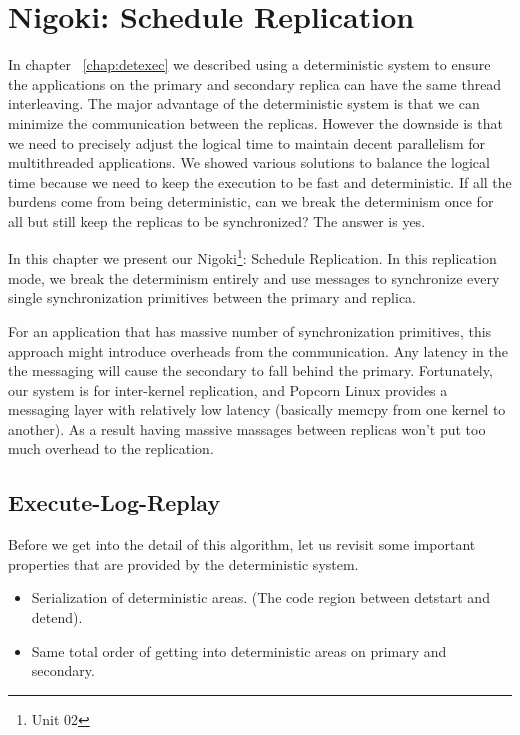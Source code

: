 \chapter{Nigoki: Schedule Replication} \label{chap:schedrep}
In chapter ~\ref{chap:detexec} we described using a deterministic system to ensure the applications on the primary and secondary replica can have the same thread interleaving. The major advantage of the deterministic system is that we can minimize the communication between the replicas. However the downside is that we need to precisely adjust the logical time to maintain decent parallelism for multithreaded applications. We showed various solutions to balance the logical time because we need to keep the execution to be fast and deterministic. If all the burdens come from being deterministic, can we break the determinism once for all but still keep the replicas to be synchronized? The answer is yes.

In this chapter we present our Nigoki\footnote{Unit 02}: Schedule Replication. In this replication mode, we break the determinism entirely and use messages to synchronize every single synchronization primitives between the primary and replica.

For an application that has massive number of synchronization primitives, this approach might introduce overheads from the communication. Any latency in the the messaging will cause the secondary to fall behind the primary. Fortunately, our system is for inter-kernel replication, and Popcorn Linux provides a messaging layer with relatively low latency (basically memcpy from one kernel to another). As a result having massive massages between replicas won't put too much overhead to the replication.


\section{Execute-Log-Replay}
Before we get into the detail of this algorithm, let us revisit some important properties that are provided by the deterministic system.

\begin{itemize}
\item Serialization of deterministic areas. (The code region between detstart and detend).
\item Same total order of getting into deterministic areas on primary and secondary.
\end{itemize}

